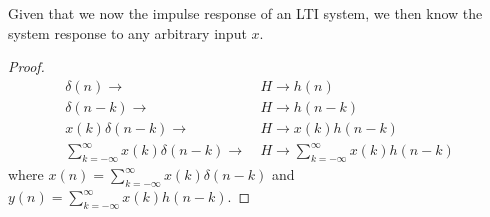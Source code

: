 \begin{theorem}
	Given that we now the impulse response of an LTI system, we then know
	the system response to any arbitrary input $x$.
\end{theorem}
\begin{proof}
	\begin{align*}
		\delta(n) \longrightarrow                                 & \ H \longrightarrow h(n)                                 \\
		\delta(n-k) \longrightarrow                               & \ H \longrightarrow h(n-k)                               \\
		x(k) \delta(n-k) \longrightarrow                          & \ H \longrightarrow x(k) h(n-k)                          \\
		\sum_{k=-\infty}^{\infty} x(k)\delta(n-k) \longrightarrow & \ H \longrightarrow \sum_{k=-\infty}^{\infty} x(k)h(n-k)
	\end{align*}
	where $x(n) = \sum_{k=-\infty}^{\infty} x(k)\delta(n-k)$ and $y(n) = \sum_{k=-\infty}^{\infty} x(k)h(n-k)$.
\end{proof}

